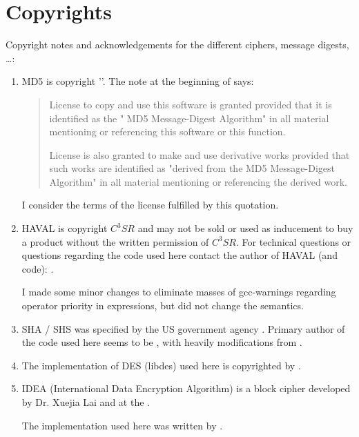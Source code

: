 \documentclass {report}
\begin{document}
\chapter {Copyrights}\label {copyright}

Copyright notes and acknowledgements for the different ciphers,
message digests, \dots {}:

\begin {enumerate}
\item	MD5 is copyright '\rsadsi{}'. The note at the
	beginning of  says:

	\begin {quotation}
		License to copy and use this software is granted
		provided that it is identified as the "\rsadsi{} MD5
		Message-Digest Algorithm" in all material mentioning
		or referencing this software or this function.
                                                                  
		License is also granted to make and use derivative
		works provided that such works are identified as
		"derived from the \rsadsi{} MD5 Message-Digest
		Algorithm" in all material mentioning or referencing
		the derived work.
	\end   {quotation}

	I consider the terms of the license fulfilled by this
	quotation. 

\item	HAVAL is copyright $C^3SR$ and may not be sold or used as
	inducement to buy a product without the written permission of
	$C^3SR$. For technical questions or questions regarding the
	code used here contact the author of HAVAL (and code): \yuliang.

	I made some minor changes to eliminate masses of \cmd
	{gcc}-warnings regarding operator priority in expressions, but
	did not change the semantics.


\item	SHA / SHS was specified by the US government agency
	\NIST. Primary author of the code used here seems to be
	\pgutmann, with heavily modifications from \uh. 

\item	The implementation of DES (libdes) used here is copyrighted by
	\eay.

\item	IDEA (International Data Encryption Algorithm) is a block
	cipher developed  by  Dr. Xuejia Lai  and \massey{} at the \sfit{}.

	The implementation used here was written by \demoliner.


\end{enumerate}
\end{document}

